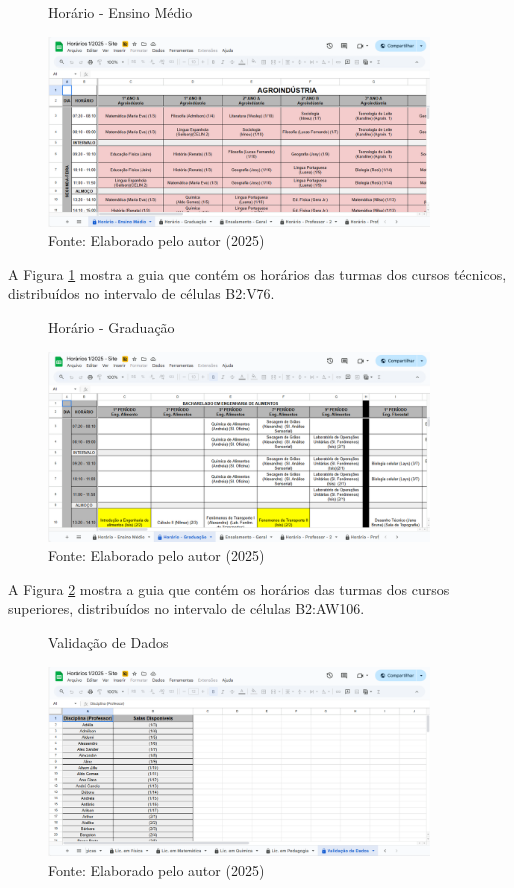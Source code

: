 \begin{figure}[H]
    \centering
    \caption{Horário - Ensino Médio}
    \includegraphics[width=0.9\textwidth]{Figuras/plan-1.png}
    \caption*{Fonte: Elaborado pelo autor (2025)}
    \label{fig_plan_1}
\end{figure}

A Figura \ref{fig_plan_1} mostra a guia que contém os horários das turmas dos cursos técnicos, distribuídos no intervalo de células B2:V76.

\begin{figure}[htb]
    \centering
    \caption{Horário - Graduação}
    \includegraphics[width=0.9\textwidth]{Figuras/plan-2.png}
    \caption*{Fonte: Elaborado pelo autor (2025)}
    \label{fig_plan_2}
\end{figure}

A Figura \ref{fig_plan_2} mostra a guia que contém os horários das turmas dos cursos superiores, distribuídos no intervalo de células B2:AW106.

\begin{figure}[H]
    \centering
    \caption{Validação de Dados}
    \includegraphics[width=0.9\textwidth]{Figuras/plan-3.png}
    \caption*{Fonte: Elaborado pelo autor (2025)}
    \label{fig_plan_3}
\end{figure}

